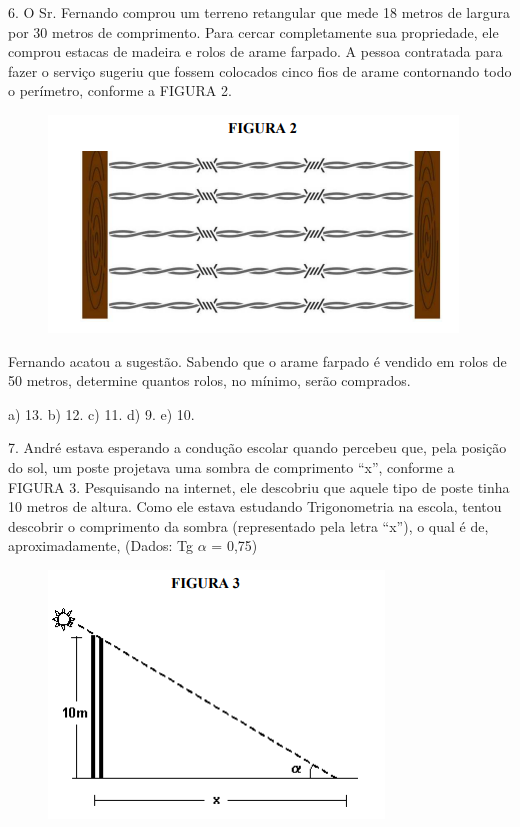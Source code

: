 \documentclass[12pt,a4paper]{article}
\begin{document}
\vspace{2ex}

6. O Sr. Fernando comprou um terreno retangular que mede 18 metros de largura por 30 metros de
comprimento. Para cercar completamente sua propriedade, ele comprou estacas de madeira e rolos de
arame farpado. A pessoa contratada para fazer o serviço sugeriu que fossem colocados cinco fios de arame
contornando todo o perímetro, conforme a FIGURA 2.

\begin{figure}[ht]
\centering
\includegraphics[width=0.6 \linewidth]{./figuras/Fig2.png}
\end{figure}

Fernando acatou a sugestão. Sabendo que o arame farpado é vendido em rolos de 50 metros, determine
quantos rolos, no mínimo, serão comprados. 

\vspace{2ex}
a) 13.
b) 12.
c) 11.
d) 9.
e) 10. 
\vspace{2ex}

7. André estava esperando a condução escolar quando percebeu que, pela posição do sol, um poste projetava
uma sombra de comprimento “x”, conforme a FIGURA 3. Pesquisando na internet, ele descobriu que
aquele tipo de poste tinha 10 metros de altura. Como ele estava estudando Trigonometria na escola, tentou
descobrir o comprimento da sombra (representado pela letra “x”), o qual é de, aproximadamente,
(Dados: Tg $\alpha$ = 0,75) 

\begin{figure}[ht]
\centering
\includegraphics[width=0.6 \linewidth]{./figuras/Fig3.png}
\end{figure}
\end{document}
